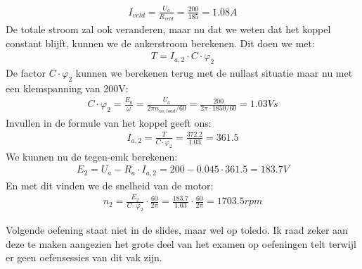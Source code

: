 \begin{oefenblok}
\begin{align*}
    I_{veld} = \frac{U_a}{R_{veld}} = \frac{200}{185} = 1.08 A
\end{align*}
De totale stroom zal ook veranderen, maar nu dat we weten dat het koppel constant blijft,
kunnen we de ankerstroom berekenen.
Dit doen we met:
\begin{align*}
    T = I_{a,2} \cdot C \cdot \varphi_2
\end{align*}
De factor $C \cdot \varphi_2$ kunnen we berekenen terug met de nullast situatie maar nu
met een klemspanning van 200V:
\begin{align*}
    C \cdot \varphi_2 = \frac{E_0}{\omega} = \frac{U_a}{2 \pi n_{no,load}/60} = \frac{200}{2 \pi \cdot 1850/60} = 1.03 Vs
\end{align*}
Invullen in de formule van het koppel geeft ons:
\begin{align*}
    I_{a,2} = \frac{T}{C \cdot \varphi_2} = \frac{372.2}{1.03} = 361.5
\end{align*}
We kunnen nu de tegen-emk berekenen:
\begin{align*}
    E_2 = U_a - R_a \cdot I_{a,2} = 200 - 0.045 \cdot 361.5 = 183.7 V
\end{align*}
En met dit vinden we de snelheid van de motor:
\begin{align*}
    n_2 = \frac{E_2}{C \cdot \varphi_2} \cdot \frac{60}{2 \pi} = \frac{183.7}{1.03} \cdot \frac{60}{2 \pi} = 1703.5 rpm
\end{align*}
\end{oefenblok}

Volgende oefening staat niet in de slides, maar wel op toledo.
Ik raad zeker aan deze te maken aangezien het grote deel van het examen op oefeningen telt
terwijl er geen oefensessies van dit vak zijn.

